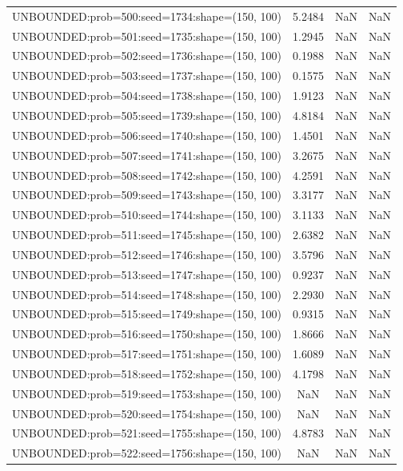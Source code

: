 \begin{longtable}{lccc}
UNBOUNDED:prob=500:seed=1734:shape=(150, 100) &  5.2484 &   NaN &    NaN \\
UNBOUNDED:prob=501:seed=1735:shape=(150, 100) &  1.2945 &   NaN &    NaN \\
UNBOUNDED:prob=502:seed=1736:shape=(150, 100) &  0.1988 &   NaN &    NaN \\
UNBOUNDED:prob=503:seed=1737:shape=(150, 100) &  0.1575 &   NaN &    NaN \\
UNBOUNDED:prob=504:seed=1738:shape=(150, 100) &  1.9123 &   NaN &    NaN \\
UNBOUNDED:prob=505:seed=1739:shape=(150, 100) &  4.8184 &   NaN &    NaN \\
UNBOUNDED:prob=506:seed=1740:shape=(150, 100) &  1.4501 &   NaN &    NaN \\
UNBOUNDED:prob=507:seed=1741:shape=(150, 100) &  3.2675 &   NaN &    NaN \\
UNBOUNDED:prob=508:seed=1742:shape=(150, 100) &  4.2591 &   NaN &    NaN \\
UNBOUNDED:prob=509:seed=1743:shape=(150, 100) &  3.3177 &   NaN &    NaN \\
UNBOUNDED:prob=510:seed=1744:shape=(150, 100) &  3.1133 &   NaN &    NaN \\
UNBOUNDED:prob=511:seed=1745:shape=(150, 100) &  2.6382 &   NaN &    NaN \\
UNBOUNDED:prob=512:seed=1746:shape=(150, 100) &  3.5796 &   NaN &    NaN \\
UNBOUNDED:prob=513:seed=1747:shape=(150, 100) &  0.9237 &   NaN &    NaN \\
UNBOUNDED:prob=514:seed=1748:shape=(150, 100) &  2.2930 &   NaN &    NaN \\
UNBOUNDED:prob=515:seed=1749:shape=(150, 100) &  0.9315 &   NaN &    NaN \\
UNBOUNDED:prob=516:seed=1750:shape=(150, 100) &  1.8666 &   NaN &    NaN \\
UNBOUNDED:prob=517:seed=1751:shape=(150, 100) &  1.6089 &   NaN &    NaN \\
UNBOUNDED:prob=518:seed=1752:shape=(150, 100) &  4.1798 &   NaN &    NaN \\
UNBOUNDED:prob=519:seed=1753:shape=(150, 100) &     NaN &   NaN &    NaN \\
UNBOUNDED:prob=520:seed=1754:shape=(150, 100) &     NaN &   NaN &    NaN \\
UNBOUNDED:prob=521:seed=1755:shape=(150, 100) &  4.8783 &   NaN &    NaN \\
UNBOUNDED:prob=522:seed=1756:shape=(150, 100) &     NaN &   NaN &    NaN \\

\end{longtable}
